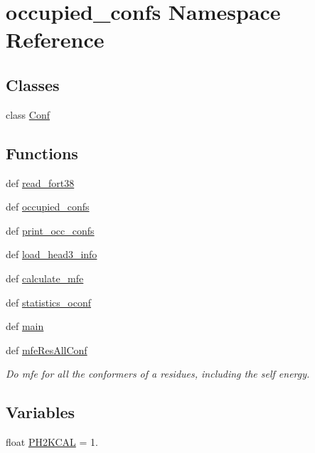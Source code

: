 \hypertarget{namespaceoccupied__confs}{\section{occupied\-\_\-confs Namespace Reference}
\label{namespaceoccupied__confs}
}
\subsection*{Classes}
\begin{DoxyCompactItemize}
\item 
class \hyperlink{classoccupied__confs_1_1_conf}{Conf}
\end{DoxyCompactItemize}
\subsection*{Functions}
\begin{DoxyCompactItemize}
\item 
def \hyperlink{namespaceoccupied__confs_abb2be2663f20e8583a149f6c1d42f7e3}{read\-\_\-fort38}
\item 
def \hyperlink{namespaceoccupied__confs_aba6d2ec44297a6a0ce264fdf8ee0453d}{occupied\-\_\-confs}
\item 
def \hyperlink{namespaceoccupied__confs_aabcdb06f7a9a6b1f7018080b671b5c9d}{print\-\_\-occ\-\_\-confs}
\item 
def \hyperlink{namespaceoccupied__confs_a97ca262c9441a32b40573af397e002d0}{load\-\_\-head3\-\_\-info}
\item 
def \hyperlink{namespaceoccupied__confs_ad1f7beb90cb1c8b409c9c18c34a8c55d}{calculate\-\_\-mfe}
\item 
def \hyperlink{namespaceoccupied__confs_ad0f92c5338cb5a8dee39425475e57826}{statistics\-\_\-oconf}
\item 
def \hyperlink{namespaceoccupied__confs_a353edaa7e2773a2d5c7df400a7fa20c4}{main}
\item 
def \hyperlink{namespaceoccupied__confs_a905a7adbfb609dda02995eb7bb8d8aea}{mfe\-Res\-All\-Conf}
\begin{DoxyCompactList}\small\item\em Do mfe for all the conformers of a residues, including the self energy. \end{DoxyCompactList}\end{DoxyCompactItemize}
\subsection*{Variables}
\begin{DoxyCompactItemize}
\item 
float \hyperlink{namespaceoccupied__confs_a931980f3113cebe40ee4286406d59bd6}{P\-H2\-K\-C\-A\-L} = 1.
\end{DoxyCompactItemize}


